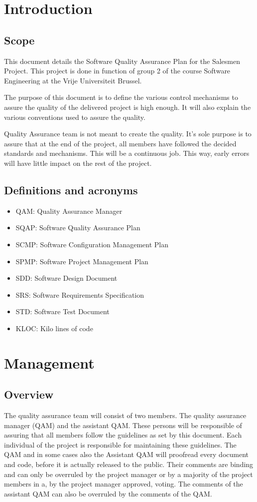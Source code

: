 \documentclass[salesmen, twoside]{softproj}
\begin{document}
\begin{projdoc}
\chapter{Introduction}
\section{Scope}
This document details the Software Quality Assurance Plan for the Salesmen Project. This project is done in function of group 2 of the course Software Engineering at the Vrije Universiteit Brussel.

The purpose of this document is to define the various control mechanisms to assure the quality of the delivered project is high enough. It will also explain the various conventions used to assure the quality.

Quality Assurance team is not meant to create the quality. It's sole purpose is to assure that at the end of the project, all members have followed the decided standards and mechanisms. This will be a continuous job. This way, early errors will have little impact on the rest of the project.

\section{Definitions and acronyms}
\begin{itemize}
\item QAM: Quality Assurance Manager
\item SQAP: Software Quality Assurance Plan
\item SCMP: Software Configuration Management Plan 
\item SPMP: Software Project Management Plan
\item SDD: Software Design Document
\item SRS: Software Requirements Specification
\item STD: Software Test Document
\item KLOC: Kilo lines of code
\end{itemize}


\chapter{Management}
\section{Overview}
The quality assurance team will consist of two members. The quality assurance manager (QAM) and the assistant QAM. These persons will be responsible of assuring that all members follow the guidelines as set by this document. Each individual of the project is responsible for maintaining these guidelines. The QAM and in some cases also the Assistant QAM will proofread every document and code, before it is actually released to the public. Their comments are binding and can only be overruled by the project manager or by a majority of the project members in a, by the project manager approved, voting. The comments of the assistant QAM can also be overruled by the comments of the QAM.



\end{projdoc}
\end{document}

